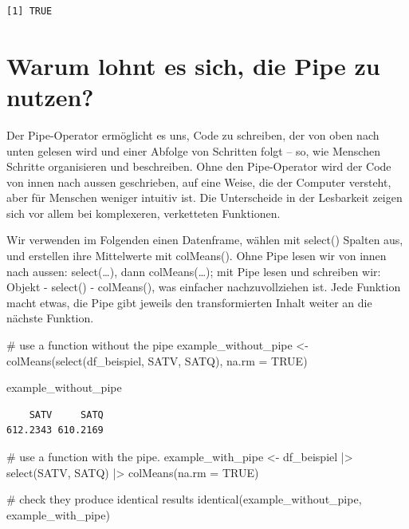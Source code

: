 \documentclass[
  letterpaper,
  DIV=11,
  numbers=noendperiod]{scrreprt}
\newenvironment{Shaded}{\begin{snugshade}}{\end{snugshade}}
\newcommand{\AttributeTok}[1]{\textcolor[rgb]{0.40,0.45,0.13}{#1}}
\newcommand{\CommentTok}[1]{\textcolor[rgb]{0.37,0.37,0.37}{#1}}
\newcommand{\ConstantTok}[1]{\textcolor[rgb]{0.56,0.35,0.01}{#1}}
\newcommand{\FunctionTok}[1]{\textcolor[rgb]{0.28,0.35,0.67}{#1}}
\newcommand{\NormalTok}[1]{\textcolor[rgb]{0.00,0.23,0.31}{#1}}
\newcommand{\OtherTok}[1]{\textcolor[rgb]{0.00,0.23,0.31}{#1}}
\newcommand{\SpecialCharTok}[1]{\textcolor[rgb]{0.37,0.37,0.37}{#1}}
\begin{document}
\begin{verbatim}
[1] TRUE
\end{verbatim}

\section{Warum lohnt es sich, die Pipe zu
nutzen?}\label{warum-lohnt-es-sich-die-pipe-zu-nutzen}

Der Pipe-Operator ermöglicht es uns, Code zu schreiben, der von oben
nach unten gelesen wird und einer Abfolge von Schritten folgt -- so, wie
Menschen Schritte organisieren und beschreiben. Ohne den Pipe-Operator
wird der Code von innen nach aussen geschrieben, auf eine Weise, die der
Computer versteht, aber für Menschen weniger intuitiv ist. Die
Unterscheide in der Lesbarkeit zeigen sich vor allem bei komplexeren,
verketteten Funktionen.

Wir verwenden im Folgenden einen Datenframe, wählen mit select() Spalten
aus, und erstellen ihre Mittelwerte mit colMeans(). Ohne Pipe lesen wir
von innen nach aussen: select(\ldots), dann colMeans(\ldots); mit Pipe
lesen und schreiben wir: Objekt - select() - colMeans(), was einfacher
nachzuvollziehen ist. Jede Funktion macht etwas, die Pipe gibt jeweils
den transformierten Inhalt weiter an die nächste Funktion.

\begin{Shaded}
\begin{Highlighting}[]
\CommentTok{\# use a function without the pipe}
\NormalTok{example\_without\_pipe }\OtherTok{\textless{}{-}} \FunctionTok{colMeans}\NormalTok{(}\FunctionTok{select}\NormalTok{(df\_beispiel, SATV, SATQ), }\AttributeTok{na.rm =} \ConstantTok{TRUE}\NormalTok{)}

\NormalTok{example\_without\_pipe}
\end{Highlighting}
\end{Shaded}

\begin{verbatim}
    SATV     SATQ 
612.2343 610.2169 
\end{verbatim}

\begin{Shaded}
\begin{Highlighting}[]
\CommentTok{\# use a function with the pipe. }
\NormalTok{example\_with\_pipe }\OtherTok{\textless{}{-}}\NormalTok{ df\_beispiel }\SpecialCharTok{|\textgreater{}} 
  \FunctionTok{select}\NormalTok{(SATV, SATQ) }\SpecialCharTok{|\textgreater{}} 
  \FunctionTok{colMeans}\NormalTok{(}\AttributeTok{na.rm =} \ConstantTok{TRUE}\NormalTok{)}

\CommentTok{\# check they produce identical results}
\FunctionTok{identical}\NormalTok{(example\_without\_pipe, example\_with\_pipe)}
\end{Highlighting}
\end{Shaded}
\end{document}
